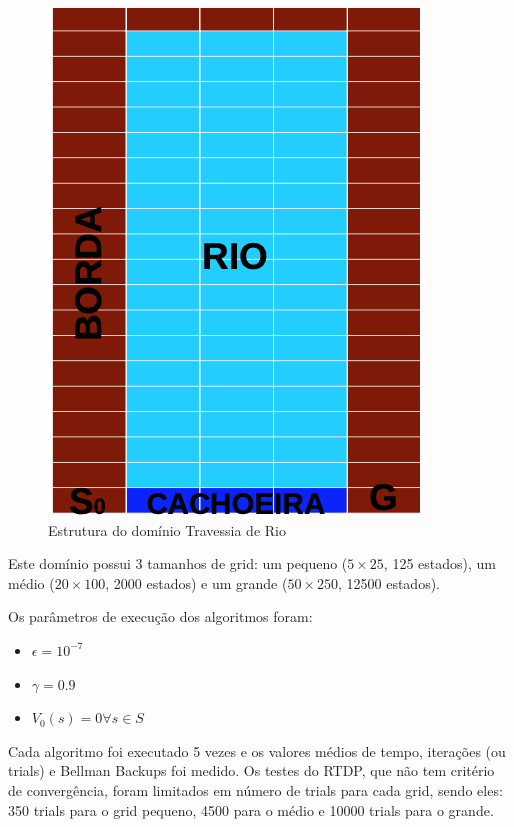 \documentclass[letterpaper]{article}
\begin{document}
\begin{figure}[t]
    \centering
    \includegraphics[width=0.9\columnwidth]{river-traversal}
    \caption{Estrutura do domínio Travessia de Rio}
    \label{fig:river-traversal-scheme}
\end{figure}

Este domínio possui 3 tamanhos de grid: um pequeno ($5 \times 25$, 125 estados), um médio ($20 \times 100$, 2000 estados) e um grande ($50 \times 250$, 12500 estados).

Os parâmetros de execução dos algoritmos foram:

\begin{itemize}
    \item $ \epsilon = 10^{-7} $
    \item $\gamma = 0.9$
    \item $ V_0(s) = 0 \forall s \in S $
\end{itemize}

Cada algoritmo foi executado 5 vezes e os valores médios de tempo, iterações (ou trials) e Bellman Backups foi medido. Os testes do RTDP, que não tem critério de convergência, foram limitados em número de trials para cada grid, sendo eles: 350 trials para o grid pequeno, 4500 para o médio e 10000 trials para o grande.
\end{document}
